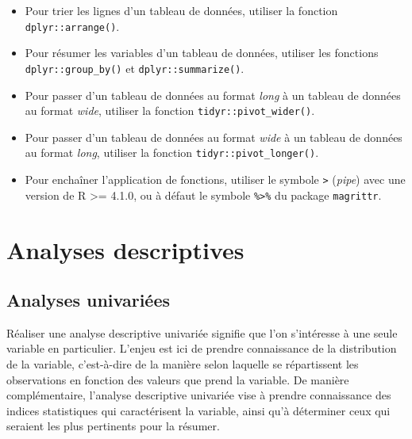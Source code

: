 \documentclass[
]{book}
\begin{document}
\begin{itemize}
\item
  Pour trier les lignes d'un tableau de données, utiliser la fonction \texttt{dplyr::arrange()}.
\item
  Pour résumer les variables d'un tableau de données, utiliser les fonctions \texttt{dplyr::group\_by()} et \texttt{dplyr::summarize()}.
\item
  Pour passer d'un tableau de données au format \emph{long} à un tableau de données au format \emph{wide}, utiliser la fonction \texttt{tidyr::pivot\_wider()}.
\item
  Pour passer d'un tableau de données au format \emph{wide} à un tableau de données au format \emph{long}, utiliser la fonction \texttt{tidyr::pivot\_longer()}.
\item
  Pour enchaîner l'application de fonctions, utiliser le symbole \texttt{\textbar{}\textgreater{}} (\emph{pipe}) avec une version de R \textgreater= 4.1.0, ou à défaut le symbole \texttt{\%\textgreater{}\%} du package \texttt{magrittr}.
\end{itemize}

\hypertarget{part-analyses-descriptives}{%
\part{Analyses descriptives}\label{part-analyses-descriptives}}

\hypertarget{analyses-univariuxe9es}{%
\chapter{Analyses univariées}\label{analyses-univariuxe9es}}

Réaliser une analyse descriptive univariée signifie que l'on s'intéresse à une seule variable en particulier. L'enjeu est ici de prendre connaissance de la distribution de la variable, c'est-à-dire de la manière selon laquelle se répartissent les observations en fonction des valeurs que prend la variable. De manière complémentaire, l'analyse descriptive univariée vise à prendre connaissance des indices statistiques qui caractérisent la variable, ainsi qu'à déterminer ceux qui seraient les plus pertinents pour la résumer.
\end{document}

